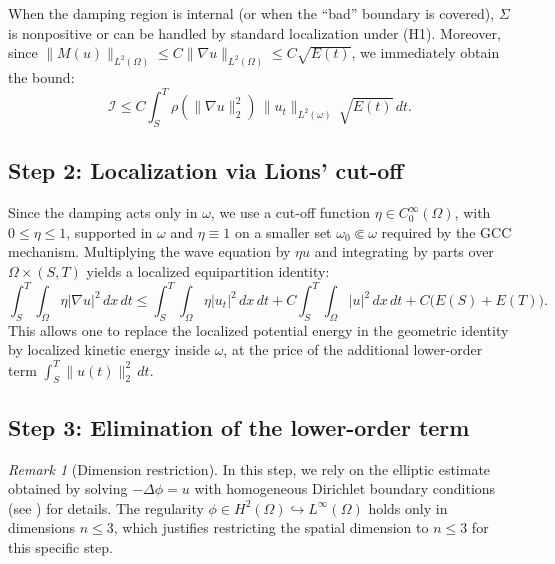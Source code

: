 \documentclass[11pt,reqno]{amsart}
\theoremstyle{remark}
\newtheorem{remark}[theorem]{Remark}
\begin{document}
When the damping region is internal (or when the ``bad'' boundary is covered), $\Sigma$ is nonpositive or can be handled by standard localization under (H1). Moreover, since $\|M(u)\|_{L^2(\Omega)}\le C\|\nabla u\|_{L^2(\Omega)}\le C\sqrt{E(t)}$, we immediately obtain the bound:
\begin{equation}\label{eq:I_estimate}
\mathcal I \le C\int_S^T \rho(\|\nabla u\|_2^2)\,\|u_t\|_{L^2(\omega)}\,\sqrt{E(t)}\,dt.
\end{equation}

\subsection{Step 2: Localization via Lions' cut-off}

Since the damping acts only in $\omega$, we use a cut-off function $\eta\in C_0^\infty(\Omega)$, with $0\le \eta\le1$, supported in $\omega$ and $\eta\equiv1$ on a smaller set $\omega_0\Subset\omega$ required by the GCC mechanism. Multiplying the wave equation by $\eta u$ and integrating by parts over $\Omega\times(S,T)$ yields a localized equipartition identity:
\begin{equation}\label{eq:equipartition}
\int_S^T\int_\Omega \eta|\nabla u|^2\,dx\,dt
\le \int_S^T\int_\Omega \eta|u_t|^2\,dx\,dt
 + C\int_S^T\int_\Omega |u|^2\,dx\,dt
 + C\bigl(E(S)+E(T)\bigr).
\end{equation}
This allows one to replace the localized potential energy in the geometric identity by localized kinetic energy inside $\omega$, at the price of the additional lower-order term $\int_S^T\|u(t)\|_2^2\,dt$.

\subsection{Step 3: Elimination of the lower-order term}

\begin{remark}[Dimension restriction]
In this step, we rely on the elliptic estimate obtained by solving $-\Delta\phi = u$ with homogeneous Dirichlet boundary conditions (see \cite{Conrad-Rao}) for details. The regularity $\phi\in H^2(\Omega)\hookrightarrow L^\infty(\Omega)$ holds only in dimensions $n\le 3$, which justifies restricting the spatial dimension to $n \le 3$ for this specific step.
\end{remark}
\end{document}
